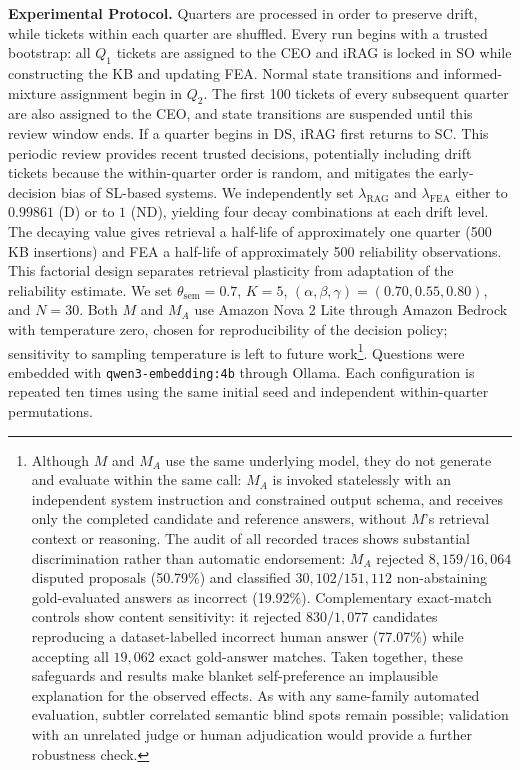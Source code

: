 \documentclass[a4paper,twoside]{article}
\begin{document}
\textbf{Experimental Protocol.}
Quarters are processed in order to preserve drift, while tickets within each quarter are shuffled. Every run begins with a trusted bootstrap: all $Q_1$ tickets are assigned to the CEO and iRAG is locked in SO while constructing the KB and updating FEA. Normal state transitions and informed-mixture assignment begin in $Q_2$. The first 100 tickets of every subsequent quarter are also assigned to the CEO, and state transitions are suspended until this review window ends. If a quarter begins in DS, iRAG first returns to SC. This periodic review provides recent trusted decisions, potentially including drift tickets because the within-quarter order is random, and mitigates the early-decision bias of SL-based systems.
We independently set $\lambda_{\mathrm{RAG}}$ and $\lambda_{\mathrm{FEA}}$ either to $0.99861$ (D) or to $1$ (ND), yielding four decay combinations at each drift level. The decaying value gives retrieval a half-life of approximately one quarter (500 KB insertions) and FEA a half-life of approximately 500 reliability observations. This factorial design separates retrieval plasticity from adaptation of the reliability estimate. We set $\theta_{\mathrm{sem}}=0.7$, $K=5$, $(\alpha,\beta,\gamma)=(0.70,0.55,0.80)$, and $N=30$. Both $M$ and $M_A$ use Amazon Nova 2 Lite through Amazon Bedrock with temperature zero, chosen for reproducibility of the decision policy; sensitivity to sampling temperature is left to future work\footnote{Although $M$ and $M_A$ use the same underlying model, they do not generate and evaluate within the same call: $M_A$ is invoked statelessly with an independent system instruction and constrained output schema, and receives only the completed candidate and reference answers, without $M$'s retrieval context or reasoning. The audit of all recorded traces shows substantial discrimination rather than automatic endorsement: $M_A$ rejected $8{,}159/16{,}064$ disputed proposals (50.79\%) and classified $30{,}102/151{,}112$ non-abstaining gold-evaluated answers as incorrect (19.92\%). Complementary exact-match controls show content sensitivity: it rejected $830/1{,}077$ candidates reproducing a dataset-labelled incorrect human answer (77.07\%) while accepting all $19{,}062$ exact gold-answer matches. Taken together, these safeguards and results make blanket self-preference an implausible explanation for the observed effects. As with any same-family automated evaluation, subtler correlated semantic blind spots remain possible; validation with an unrelated judge or human adjudication would provide a further robustness check.}. Questions were embedded with \texttt{qwen3-embedding:4b} through Ollama. Each configuration is repeated ten times using the same initial seed and independent within-quarter permutations.
\end{document}

